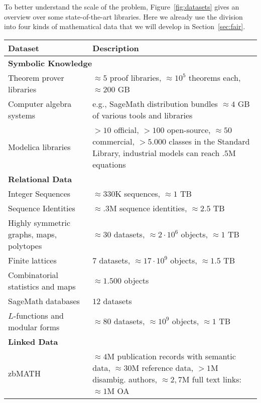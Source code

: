 To better understand the scale of the problem, Figure~\ref{fig:datasets} gives an overview over some state-of-the-art libraries.
Here we already use the division into four kinds of mathematical data that we will develop in Section~\ref{sec:fair}.

\begin{figure*}[htp]\centering\small{}
  \begin{tabular}{| p{} | p{}|}\hline
  Dataset & Description \\\hline\hline
  \multicolumn{2}{|l|}{\textbf{Symbolic Knowledge}} \\\hline
  Theorem prover libraries \cite{OAFproject:on}  & $\approx 5$ proof libraries, $\approx 10^5$ theorems each, $\approx 200$ GB \\\hline
  Computer algebra systems \cite{sagemath} & e.g., SageMath distribution bundles $\approx 4$ GB of various tools and libraries\\\hline
  Modelica libraries \cite{Modelica:on} &$> 10$ official, $> 100$ open-source, $\approx 50$ commercial,
      $> 5.000$ classes in the Standard Library, industrial models can reach $.5$M equations \\\hline
  \multicolumn{2}{|l|}{\textbf{Relational Data}} \\\hline
 Integer Sequences \cite{OEIS:on} & $\approx 330$K sequences, $\approx 1$ TB  \\\hline
 Sequence Identities \cite{kwarc:datahost:on} & $\approx .3$M sequence identities, $\approx 2.5$ TB \\\hline
 Highly symmetric graphs, maps, polytopes \cite{ConderCensuses:on, HartleyPolytopes:on, LeemansPolytopes:on, PotocnikCensuses:on, RoyleVT:on, WilsonET:on} & $\approx 30$ datasets, $\approx 2\cdot10^6$ objects, $\approx 1$ TB \\\hline
  Finite lattices \cite{KohLat:on, LeeLat:on, MalLat:on} & $7$ datasets, $\approx 17 \cdot 10^9$ objects, $\approx 1.5$ TB \\\hline
  Combinatorial statistics and maps \cite{findstat} & $\approx1.500$ objects \\\hline
  SageMath databases \cite{SageDB:on} & $12$ datasets \\\hline
  $L$-functions and modular forms \cite{lmfdb:on} & $\approx 80$ datasets, $\approx 10^9$ objects, $\approx 1$ TB \\\hline
  \multicolumn{2}{|l|}{\textbf{Linked Data}} \\\hline
   zbMATH \cite{zbMATH:on} & $\approx 4$M publication records with semantic data, $\approx 30$M reference data, $>1$M disambig. authors, $\approx 2,7$M full text links: $\approx 1$M OA \\\hline

\end{tabular}
\end{figure*}
